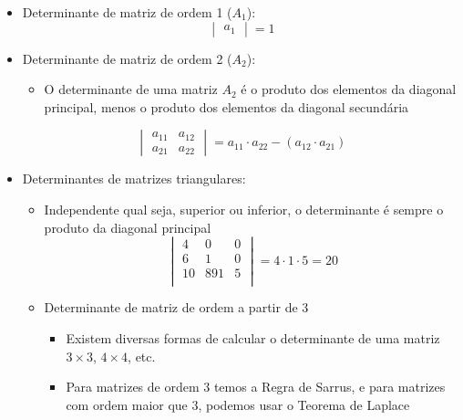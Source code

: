 \documentclass[12pt]{article}
\begin{document}
\begin{itemize}
    \item Determinante de matriz de ordem 1 ($A_1$):
    \[ \begin{vmatrix} a_{1} \end{vmatrix} = 1 \]
    \item Determinante de matriz de ordem 2 ($A_2$):
    \begin{itemize}
        \item O determinante de uma matriz $A_2$ é o produto dos elementos 
        da diagonal principal, menos o produto dos elementos da diagonal 
        secundária
    \end{itemize}
    \[
    \begin{vmatrix}
        a_{11} & a_{12} \\
        a_{21} & a_{22} 
    \end{vmatrix}
    = a_{11} \cdot a_{22} - (a_{12} \cdot a_{21})
    \]
    \item Determinantes de matrizes triangulares:
    \begin{itemize}
        \item Independente qual seja, superior ou inferior, o determinante 
        é sempre o produto da diagonal principal
        \[
        \begin{vmatrix}
            4 & 0 & 0 \\
            6 & 1 & 0 \\
            10 & 891 & 5 \\
        \end{vmatrix}
        = 4 \cdot 1 \cdot 5 = 20
        \] 
        \item Determinante de matriz de ordem a partir de 3
        \begin{itemize}
            \item Existem diversas formas de calcular o determinante de 
            uma matriz $3\times3$, $4\times4$, etc.
            \item Para matrizes de ordem 3 temos a Regra de Sarrus, e para 
            matrizes com ordem maior que 3, podemos usar o Teorema de Laplace 
        \end{itemize}
    \end{itemize}
\end{itemize}
\end{document}
